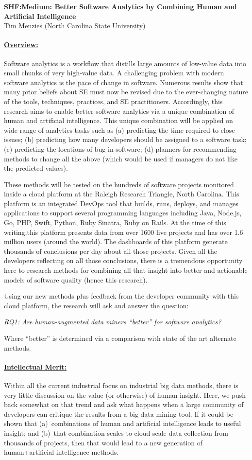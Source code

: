 \documentclass[11pt,letterpaper]{article}
\newcommand\myTitle{\newpage
\begin{center}
{\bf SHF:Medium: Better Software Analytics by Combining Human and Artificial Intelligence}\\
Tim Menzies (North Carolina State University)
\end{center}}
\newcommand\head[1]{\paragraph{\underline{#1}}}
\begin{document}
\pagestyle{plain}
\myTitle
\pagestyle{empty}

\head{Overview:}

Software analytics is a workflow that distills large amounts of low-value data into small chunks of very high-value data. 
A challenging problem with modern software analytics is the pace of change in software.  Numerous results  show that many prior beliefs about SE must now be revised due to the ever-changing nature of the tools, techniques, practices, and SE practitioners.  Accordingly, this research aims to enable better software analytics
via a unique combination of human and artificial intelligence. This unique combination will be applied on wide-range of analytics tasks such as (a) predicting the time required to close issues; (b) predicting how many developers should be assigned to a software task; (c) predicting the locations of bug in software; (d)  planners for recommending methods to change all the above (which would be used if managers do not like the predicted values). 

These methods will be tested on the hundreds  of software projects monitored inside a cloud platform at the Raleigh Research Triangle,  North Carolina.  This platform is an integrated DevOps tool that builds, runs, deploys, and manages applications to support several programming languages including Java, Node.js, Go, PHP, Swift, Python, Ruby Sinatra, Ruby on Rails. At the time of this writing,this platform presents data from over 1600 live projects and has over 1.6 million users (around the world).
The dashboards of this platform generate thousands of conclusions per day about all those projects.
Given all the developers reflecting on all those conclusions, there is a tremendous opportunity here to research methods for combining all that insight into better and actionable models of software quality (hence this research).

Using  our new methods plus feedback from the developer community with this cloud platform, the research  will ask and answer the question:
\begin{center}
 {\em RQ1:  Are human-augmented data miners ``better'' for software  analytics?}
\end{center}
Where ``better'' is determined via a comparison with state of the art alternate methods.
\head{Intellectual Merit:} Within all the current industrial focus on industrial big data methods, there is very
little discussion on the value (or otherwise) of human insight. Here, we push back somewhat on that trend and ask what happens when a large
community of developers can critique the results from a big data mining tool.
If it could be shown  that (a)~combinations of human and artificial intelligence leads to useful insight; and (b)~that combination scales to cloud-scale
data collection from thousands of projects, then that would lead to a new generation of human+artificial intelligence methods.
 
\end{document}
